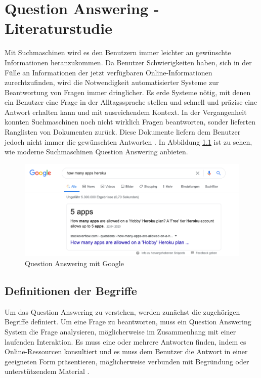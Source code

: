 \documentclass[
        ngerman,
        paper=a4,
        numbers=noendperiod,
]{scrreprt}
\begin{document}
\chapter{Question Answering - Literaturstudie} 


    
Mit Suchmaschinen wird es den Benutzern immer leichter an gewünschte Informationen heranzukommen. Da Benutzer Schwierigkeiten haben, sich in der Fülle an Informationen der jetzt verfügbaren Online-Informationen zurechtzufinden, wird die Notwendigkeit automatisierter Systeme zur Beantwortung von Fragen immer dringlicher. Es erde Systeme nötig, mit denen ein Benutzer eine Frage in der Alltagssprache stellen und schnell und präzise eine Antwort erhalten kann und mit ausreichendem Kontext. In der Vergangenheit konnten Suchmaschinen noch nicht wirklich Fragen beantworten, sonder lieferten Ranglisten von Dokumenten zurück. Diese Dokumente liefern dem Benutzer jedoch nicht immer die gewünschten Antworten \citep[S. 275]{Hirschman2001NaturalHere}. In Abbildung \ref{fig:google} ist zu sehen, wie moderne Suchmaschinen Question Answering anbieten.

\begin{figure}[H]
    \centering\includegraphics[width=1\linewidth]{images/google.png}
    \caption[Question Answering mit Google]{Question Answering mit Google}
    \label{fig:google}
\end{figure}


\section{Definitionen der Begriffe}
Um das Question Answering zu verstehen, werden zunächst die zugehörigen Begriffe definiert. Um eine Frage zu beantworten, muss ein Question Answering System die Frage analysieren, möglicherweise im Zusammenhang mit einer laufenden Interaktion. Es muss eine oder mehrere Antworten finden, indem es Online-Ressourcen konsultiert und es muss dem Benutzer die Antwort in einer geeigneten Form präsentieren, möglicherweise verbunden mit Begründung oder unterstützendem Material \citep[S. 276]{Hirschman2001NaturalHere}. 
\end{document}
